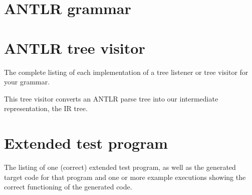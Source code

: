 \documentclass[a4paper]{article}
\begin{document}
\begin{appendices}

\label{grammar}
\section{ANTLR grammar}



\label{visitor}
\section{ANTLR tree visitor}
The complete listing of each implementation of a
tree listener or tree visitor for your grammar.

This tree visitor converts an ANTLR parse tree into our intermediate representation, the IR tree.



\section{Extended test program}
The listing of one (correct) extended test program, as well as the generated
target code for that program and one or more example executions showing the correct functioning of
the generated code.

\end{appendices}
\end{document}
